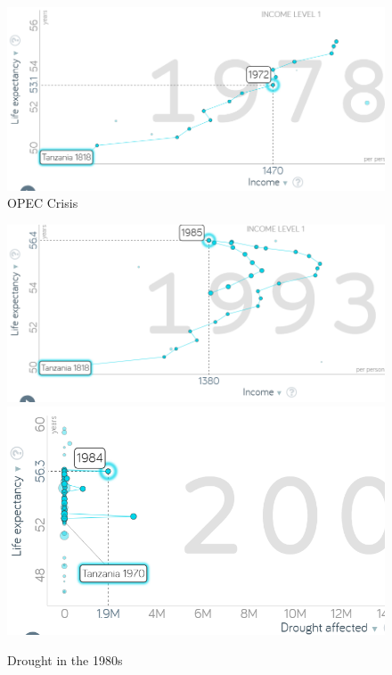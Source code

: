 \documentclass[12pt]{article}
\begin{document}
      \begin{figure}[h!]
\includegraphics[width=\linewidth , height = 0.37\linewidth]{tanz_1970s.png}
\caption{OPEC Crisis}
 \label{fig:tanz70s}
 \end{figure}
 
     
\begin{figure}[h!]
	\includegraphics[width=0.49\linewidth ,  height=0.37\linewidth]{tanz_1980s}
	\includegraphics[width=0.49\linewidth , height=0.37\linewidth]{tanz_drought}
	\caption{Drought in the 1980s}
	 \label{fig:drought}
\end{figure}

 

 
\end{document}
